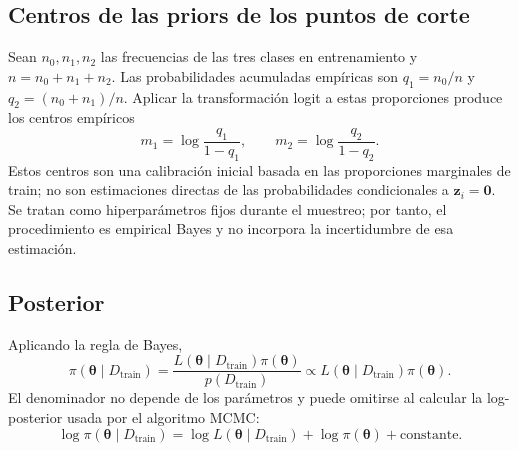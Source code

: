 \subsection{Centros de las priors de los puntos de corte}
Sean $n_0,n_1,n_2$ las frecuencias de las tres clases en entrenamiento y
$n=n_0+n_1+n_2$. Las probabilidades acumuladas empíricas son
$q_1=n_0/n$ y $q_2=(n_0+n_1)/n$. Aplicar la transformación logit a estas
proporciones produce los centros empíricos
\[
m_1=\log\frac{q_1}{1-q_1},\qquad
m_2=\log\frac{q_2}{1-q_2}.
\]
Estos centros son una calibración inicial basada en las proporciones marginales
de train; no son estimaciones directas de las probabilidades condicionales a
$\mathbf{z}_i=\mathbf{0}$. Se tratan como hiperparámetros fijos durante el
muestreo; por tanto, el procedimiento es empirical Bayes y no incorpora la
incertidumbre de esa estimación.

\subsection{Posterior}
Aplicando la regla de Bayes,
\[
\pi(\boldsymbol{\theta}\mid D_{\mathrm{train}})
=\frac{L(\boldsymbol{\theta}\mid D_{\mathrm{train}})
       \pi(\boldsymbol{\theta})}
      {p(D_{\mathrm{train}})}
\propto
L(\boldsymbol{\theta}\mid D_{\mathrm{train}})
\pi(\boldsymbol{\theta}).
\]
El denominador no depende de los parámetros y puede omitirse al calcular la
log-posterior usada por el algoritmo MCMC:
\[
\log\pi(\boldsymbol{\theta}\mid D_{\mathrm{train}})
=\log L(\boldsymbol{\theta}\mid D_{\mathrm{train}})
+\log\pi(\boldsymbol{\theta})+\text{constante}.
\]
